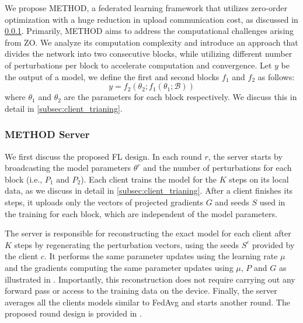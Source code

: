 We propose \ac{METHOD}, a federated learning framework that utilizes zero-order optimization with a huge reduction in upload communication cost, as discussed in \cref{sec:server_design}.  Primarily, \ac{METHOD} aims to address the computational challenges arising from \ac{ZO}. We analyze its computation complexity and introduce an approach that divides the network into two consecutive blocks, while utilizing different number of perturbations per block to accelerate computation and convergence. Let $y$ be the output of a model, we define the first and second blocks $f_{1}$ and $f_{2}$ as follows:  
\begin{equation}
    y = f_{2}(\theta_{2}; f_{1}(\theta_{1}; \mathcal{B}))
\end{equation}
where $\theta_{1}$ and $\theta_{2}$ are the parameters for each block respectively. We discuss this in detail in \cref{subsec:client_trianing}. 



\subsubsection{\ac{METHOD} Server}
\label{sec:server_design}
We first discuss the proposed \ac{FL} design. In each round $r$,  the server starts by broadcasting the model parameters $\theta^{r}$ and the number of perturbations for each block (i.e., $P_{1}$ and $P_{2}$). 
Each client trains the model for the $K$ steps on its local data, as we discuss in detail in \cref{subsec:client_trianing}. After a client finishes its steps, it uploads only the vectors of projected gradients $G$ and seeds $S$ used in the training for each block, which are independent of the model parameters.

The server is responsible for reconstructing the exact model for each client after $K$ steps by regenerating the perturbation vectors, using the seeds $S^{c}$  provided by the client $c$. It performs the same parameter updates using the learning rate $\mu$ and the gradients computing the same parameter updates using $\mu$, $P$ and $G$ as illustrated in . Importantly, this reconstruction does not require carrying out any forward pass or access to the training data on the device.  Finally, the server averages all the clients models similar to FedAvg and starts another round. The proposed round design is provided in .



  



